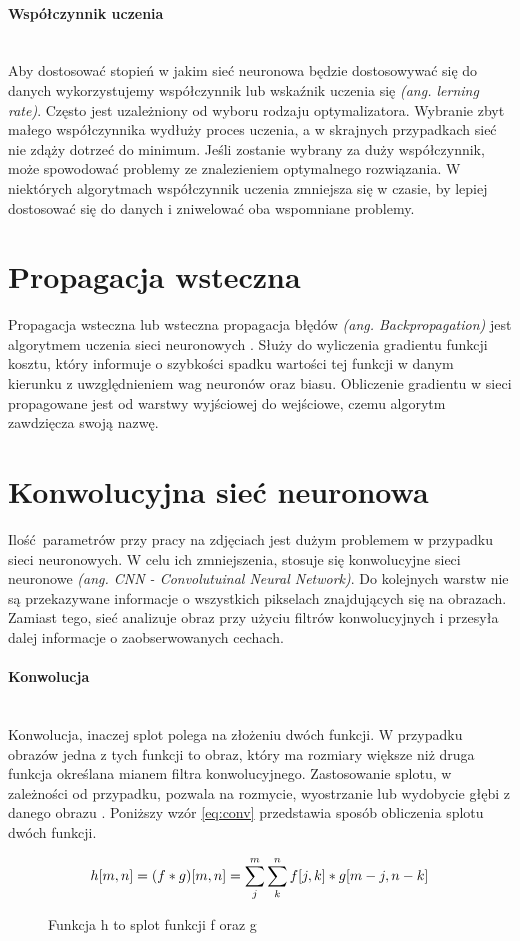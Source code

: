 \paragraph{Współczynnik uczenia} \mbox{}\\
Aby dostosować stopień w jakim sieć neuronowa będzie dostosowywać się do danych wykorzystujemy
współczynnik lub wskaźnik uczenia się \textit{(ang. lerning rate)}. Często jest
uzależniony od wyboru rodzaju optymalizatora. Wybranie zbyt małego współczynnika wydłuży
proces uczenia, a w skrajnych przypadkach sieć nie zdąży dotrzeć do minimum.
Jeśli zostanie wybrany za duży współczynnik, może spowodować problemy ze znalezieniem
optymalnego rozwiązania. W niektórych algorytmach współczynnik uczenia zmniejsza się w czasie,
by lepiej dostosować się do danych i zniwelować oba wspomniane problemy.

\section{Propagacja wsteczna}
Propagacja wsteczna lub wsteczna propagacja błędów \textit{(ang. Backpropagation)}
jest algorytmem uczenia sieci neuronowych \cite{CS231n_ackprop, backprop}.
Służy do wyliczenia gradientu funkcji kosztu, który informuje o szybkości spadku wartości tej funkcji
w danym kierunku z uwzględnieniem wag neuronów oraz biasu. Obliczenie gradientu w sieci propagowane
jest od warstwy wyjściowej do wejściowe, czemu algorytm zawdzięcza swoją nazwę.

\section{Konwolucyjna sieć neuronowa}

Ilość parametrów przy pracy na zdjęciach jest dużym problemem w przypadku sieci neuronowych.
W celu ich zmniejszenia, stosuje się konwolucyjne sieci neuronowe \textit{(ang. CNN - Convolutuinal Neural Network)}.
Do kolejnych warstw nie są przekazywane informacje o wszystkich pikselach znajdujących się
na obrazach. Zamiast tego, sieć analizuje obraz przy użyciu filtrów konwolucyjnych i
przesyła dalej informacje o zaobserwowanych cechach.

\paragraph{Konwolucja} \mbox{}\\
Konwolucja, inaczej splot polega na złożeniu dwóch funkcji. W przypadku obrazów
jedna z tych funkcji to obraz, który ma rozmiary większe niż druga funkcja określana
mianem filtra konwolucyjnego. Zastosowanie splotu, w zależności od przypadku,
pozwala na rozmycie, wyostrzanie lub wydobycie głębi z danego obrazu \cite{konwolucja}.
Poniższy wzór \ref{eq:conv} przedstawia sposób obliczenia splotu dwóch funkcji.
\begin{figure}[h!]
\renewcommand{\figurename}{Wzór}%
\begin{equation} \label{eq:conv}
h[m, n] = (f * g)[m, n] = \sum_j^m \sum_k^n f[j, k] * g[m-j, n-k] \\
\end{equation}
\caption{Funkcja h to splot funkcji f oraz g}
\end{figure}

